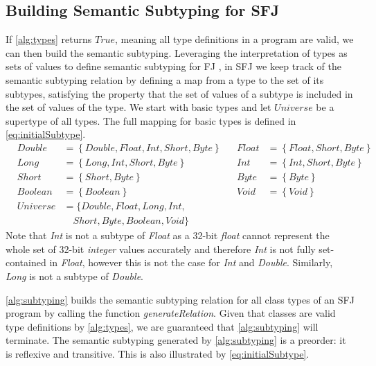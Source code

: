 \documentclass[runningheads]{llncs}
\begin{document}
\subsection{Building Semantic Subtyping for SFJ}
\label{sec:subtypingAlgo}
If \autoref{alg:types} returns $True$, meaning all type definitions in a program are valid, we can then build the semantic subtyping.
Leveraging the interpretation of types as sets of values to define semantic subtyping for FJ \cite{Dardha2013,Dardha2017}, in SFJ we keep track of the semantic subtyping relation by defining a map from a type to the set of its subtypes, satisfying the property that the set of values of a subtype is included in the set of values of the type.
We start with basic types and let $Universe$ be a supertype of all types.
The full mapping for basic types is defined in \autoref{eq:initialSubtype}.
\begin{equation}
    \label{eq:initialSubtype}
    \begin{array}{llllll}
        & Double   & = \left\{Double, Float, Int, Short, Byte\right\} &  & Float & = \left\{Float, Short, Byte\right\} \\
        & Long     & =    \left\{Long, Int, Short, Byte\right\}       &  & Int   & = \left\{Int, Short, Byte\right\}   \\
        & Short    & =    \left\{Short, Byte\right\}                  &  & Byte  & = \left\{Byte\right\}               \\
        & Boolean  & =    \left\{Boolean\right\}                      &  & Void  & = \left\{Void\right\}               \\
        & Universe & = \{Double, Float, Long, Int,                                                                     \\
        &          & \quad Short, Byte, Boolean, Void\}
   \end{array}
\end{equation}
Note that \emph{Int} is not a subtype of \emph{Float} as a 32-bit \emph{float} cannot represent the whole set of 32-bit \emph{integer} values accurately and therefore \emph{Int} is not fully set-contained in \emph{Float}, however this is not the case for \emph{Int} and \emph{Double}.
Similarly, \emph{Long} is not a subtype of \emph{Double}.

\autoref{alg:subtyping} builds the semantic subtyping relation for all class types of an SFJ program by calling the function \textit{generateRelation}.
Given that classes are valid type definitions by \autoref{alg:types}, we are guaranteed that \autoref{alg:subtyping} will terminate.
The semantic subtyping generated by \autoref{alg:subtyping} is a preorder: it is reflexive and transitive. This is also illustrated by \autoref{eq:initialSubtype}.
\end{document}
